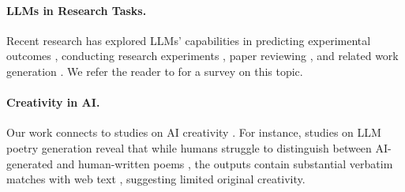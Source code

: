 \paragraph{LLMs in Research Tasks.} Recent research has explored LLMs' capabilities in predicting experimental outcomes \citep{luo2024large}, conducting research experiments \citep{huang2023benchmarking, tian2024scicode}, paper reviewing \citep{weng2024cycleresearcher, zeng2023scientific}, and related work generation \citep{hu2024hireview}. We refer the reader to \citet{luo2025llm4sr} for a survey on this topic.

\paragraph{Creativity in AI.} Our work connects to studies on AI creativity \citep{ismayilzada2024creativity}. 
For instance, studies on LLM poetry generation reveal that while humans struggle to distinguish between AI-generated and human-written poems \citep{porter2024ai},
the outputs contain substantial verbatim matches with web text \citep{djsearch}, suggesting limited original creativity.
